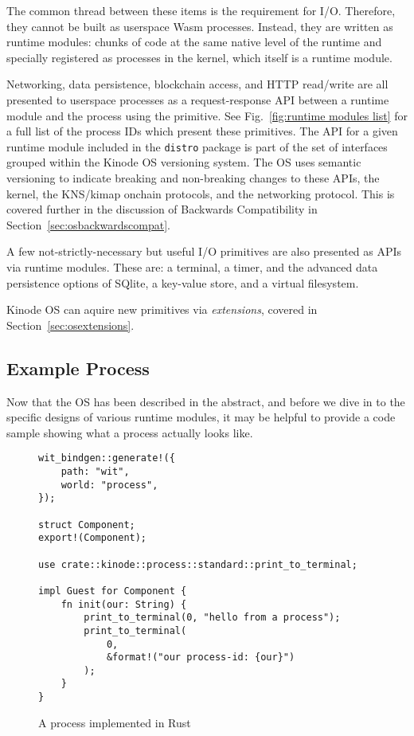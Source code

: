 \documentclass[runningheads]{llncs}
\begin{document}
The common thread between these items is the requirement for I/O.
Therefore, they cannot be built as userspace Wasm processes.
Instead, they are written as runtime modules: chunks of code at the same native level of the runtime and specially registered as processes in the kernel, which itself is a runtime module.

Networking, data persistence, blockchain access, and HTTP read/write are all presented to userspace processes as a request-response API between a runtime module and the process using the primitive.
See Fig.~\ref{fig:runtime modules list} for a full list of the process IDs which present these primitives.
The API for a given runtime module included in the \verb|distro| package is part of the set of interfaces grouped within the Kinode OS versioning system.
The OS uses semantic versioning to indicate breaking and non-breaking changes to these APIs, the kernel, the KNS/kimap onchain protocols, and the networking protocol.
This is covered further in the discussion of Backwards Compatibility in Section~\ref{sec:osbackwardscompat}.

A few not-strictly-necessary but useful I/O primitives are also presented as APIs via runtime modules.
These are: a terminal, a timer, and the advanced data persistence options of SQlite, a key-value store, and a virtual filesystem.

Kinode OS can aquire new primitives via \textit{extensions}, covered in Section~\ref{sec:osextensions}.

\subsection{Example Process}
\label{sec:osexampleprocess}

Now that the OS has been described in the abstract, and before we dive in to the specific designs of various runtime modules, it may be helpful to provide a code sample showing what a process actually looks like.

\begin{figure}[H]
\begin{lstlisting}
wit_bindgen::generate!({
    path: "wit",
    world: "process",
});

struct Component;
export!(Component);

use crate::kinode::process::standard::print_to_terminal;

impl Guest for Component {
    fn init(our: String) {
        print_to_terminal(0, "hello from a process");
        print_to_terminal(
            0,
            &format!("our process-id: {our}")
        );
    }
}
\end{lstlisting}
    \caption{A process implemented in Rust}
    \label{fig:example process}
\end{figure}
\end{document}
